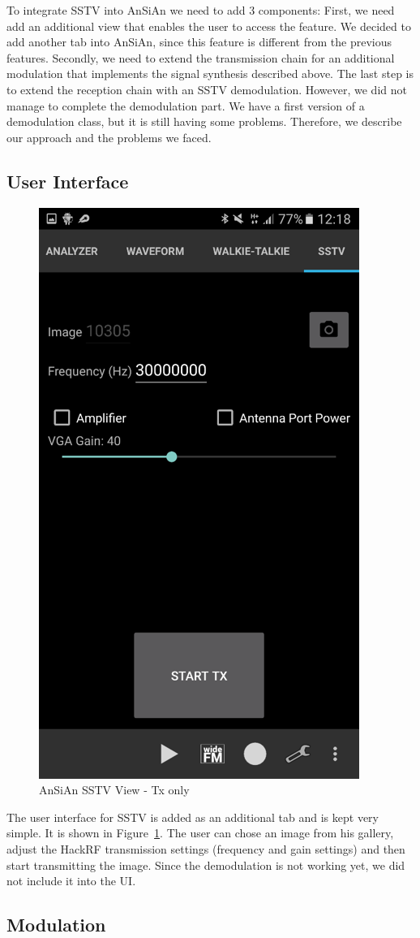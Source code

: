 To integrate \ac{SSTV} into \ac{AnSiAn} we need to add 3 components: First, we need add an additional view that enables the user to access the feature. We decided to add another tab into AnSiAn, since this feature is different from the previous features. Secondly, we need to extend the transmission chain for an additional modulation that implements the signal synthesis described above. The last step is to extend the reception chain with an SSTV demodulation. However, we did not manage to complete the demodulation part. We have a first version of a demodulation class, but it is still having some problems. Therefore, we describe our approach and the problems we faced. 


\subsection{User Interface}
\label{subsec:impl:sstv:ui}

\begin{figure}[!htbp]
	\centering
	\includegraphics[width=0.4\linewidth]{gfx/screenshot_gui_sstv.png}
	\caption{AnSiAn \ac{SSTV} View - Tx only}
	\label{fig:impl:sstv:gui}
\end{figure}

The user interface for SSTV is added as an additional tab and is kept very simple. It is shown in Figure~\ref{fig:impl:sstv:gui}. The user can chose an image from his gallery, adjust the HackRF transmission settings (frequency and gain settings) and then start transmitting the image. Since the demodulation is not working yet, we did not include it into the UI. 

\subsection{Modulation}
\label{subsubsec:impl:sstv:mod}

